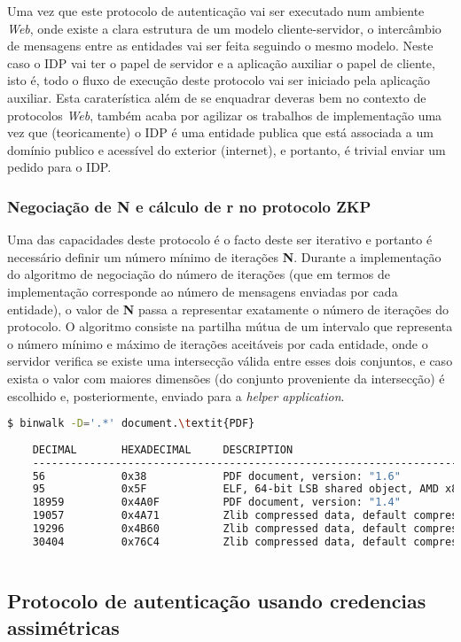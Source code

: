 \quad Uma vez que este protocolo de autenticação vai ser executado num ambiente \textit{Web}, onde existe a clara estrutura de um modelo cliente-servidor, o intercâmbio de mensagens entre as entidades vai ser feita seguindo o mesmo modelo. Neste caso o IDP vai ter o papel de servidor e a aplicação auxiliar o papel de cliente, isto é, todo o fluxo de execução deste protocolo vai ser iniciado pela aplicação auxiliar. Esta caraterística além de se enquadrar deveras bem no contexto de protocolos \textit{Web}, também acaba por agilizar os trabalhos de implementação uma vez que (teoricamente) o IDP é uma entidade publica que está associada a um domínio publico e acessível do exterior (internet), e portanto, é trivial enviar um pedido para o IDP. 

\subsubsection{Negociação de N e cálculo de r no protocolo ZKP}
\label{mat_zkp}

\quad Uma das capacidades deste protocolo é o facto deste ser iterativo e portanto é necessário definir um número mínimo de iterações \textbf{N}. Durante a implementação do algoritmo de negociação do número de iterações (que em termos de implementação corresponde ao número de mensagens enviadas por cada entidade), o valor de \textbf{N} passa a representar exatamente o número de iterações do protocolo. O algoritmo consiste na partilha mútua de um intervalo que representa o número mínimo e máximo de iterações aceitáveis por cada entidade, onde o servidor verifica se existe uma intersecção válida entre esses dois conjuntos, e caso exista o valor com maiores dimensões (do conjunto proveniente da intersecção) é escolhido e, posteriormente, enviado para a \textit{helper application}.

\begin{minipage}{\linewidth}
    \begin{lstlisting}[language=bash, caption={Utilização do \textit{Binwalk} para obter os ficheiros embebidos no documento sob análise.}, label={lst:binwalk}]
    $ binwalk -D='.*' document.\textit{PDF}
    
    DECIMAL       HEXADECIMAL     DESCRIPTION
    --------------------------------------------------------------------------------
    56            0x38            PDF document, version: "1.6"
    95            0x5F            ELF, 64-bit LSB shared object, AMD x86-64, version 1 (SYSV)
    18959         0x4A0F          PDF document, version: "1.4"
    19057         0x4A71          Zlib compressed data, default compression
    19296         0x4B60          Zlib compressed data, default compression
    30404         0x76C4          Zlib compressed data, default compression
    
    \end{lstlisting}
    \end{minipage}


\subsection{Protocolo de autenticação usando credencias assimétricas}